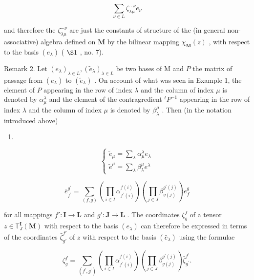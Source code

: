 \[
\sum_ {\nu \in L} \zeta_ {\lambda \mu}^{\cdot \cdot \nu} e _ {\nu}
\]

and therefore the \(\zeta_{\lambda \mu}^{\cdots \nu}\) are just the constants of structure of the (in general non-associative) algebra defined on \(\mathbf{M}\) by the bilinear mapping \(\chi_{\mathbf{M}}(z)\) , with respect to the basis \((e_{\lambda})\) ( \(\S 1\) , no. 7).

Remark 2. Let \((e_{\lambda})_{\lambda \in L}, (\tilde{e}_{\lambda})_{\lambda \in L}\) be two bases of M and \(P\) the matrix of passage from \((e_{\lambda})\) to \((\tilde{e}_{\lambda})\) . On account of what was seen in Example 1, the element of \(P\) appearing in the row of index \(\lambda\) and the column of index \(\mu\) is denoted by \(\alpha_{\mu}^{\lambda}\) and the element of the contragredient \(^{t}P^{-1}\) appearing in the row of index \(\lambda\) and the column of index \(\mu\) is denoted by \(\beta_{\lambda}^{\mu}\) . Then (in the notation introduced above)

\begin{enumerate}
\def\labelenumi{(\arabic{enumi})}
\setcounter{enumi}{18}
\tightlist
\item
\end{enumerate}

\[
\left\{ \begin{array}{l} \tilde {e} _ {\mu} = \sum_ {\lambda} \alpha_ {\mu} ^ {\lambda} e _ {\lambda} \\ \tilde {e} ^ {\mu} = \sum_ {\lambda} \beta_ {\lambda} ^ {\mu} e ^ {\lambda} \end{array} \right.\tag{20}
\]

\[
\bar {e} _ {f ^ {\prime}} ^ {g ^ {\prime}} = \sum_ {(f, g)} \left(\prod_ {i \in I} \alpha_ {f ^ {\prime} (i)} ^ {f (i)}\right) \left(\prod_ {j \in J} \beta_ {g (j)} ^ {g ^ {\prime} (j)}\right) e _ {f} ^ {g}
\]

for all mappings \(f': \mathbf{I} \to \mathbf{L}\) and \(g': \mathbf{J} \to \mathbf{L}\) . The coordinates \(\zeta_g^f\) of a tensor \(z \in \mathbb{T}_J^{\mathbf{I}}(\mathbf{M})\) with respect to the basis \((e_{\lambda})\) can therefore be expressed in terms of the coordinates \(\bar{\zeta}_{g'}^{f'}\) of \(z\) with respect to the basis \((\bar{e}_{\lambda})\) using the formulae

\[
\zeta_ {g} ^ {f} = \sum_ {(f ^ {\prime}, g ^ {\prime})} \left(\prod_ {i \in I} \alpha_ {f ^ {\prime} (i)} ^ {f (i)}\right) \left(\prod_ {j \in J} \beta_ {g (j)} ^ {g ^ {\prime} (j)}\right) \bar {\zeta} _ {g ^ {\prime}} ^ {f ^ {\prime}}.\tag{21}
\]

